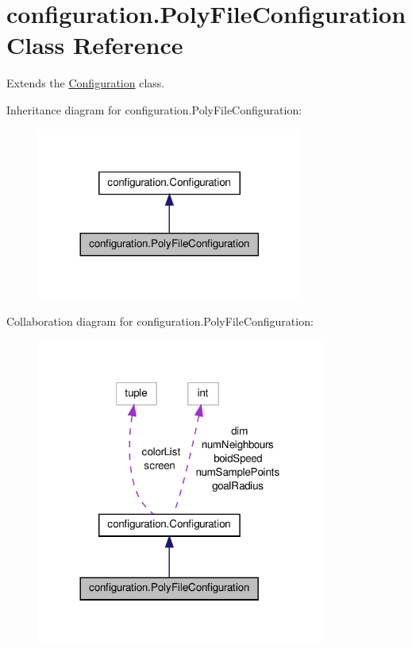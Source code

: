 \hypertarget{classconfiguration_1_1PolyFileConfiguration}{\section{configuration.\-Poly\-File\-Configuration Class Reference}
\label{classconfiguration_1_1PolyFileConfiguration}
}


Extends the \hyperlink{classconfiguration_1_1Configuration}{Configuration} class.  




Inheritance diagram for configuration.\-Poly\-File\-Configuration\-:
\nopagebreak
\begin{figure}[H]
\begin{center}
\leavevmode
\includegraphics[width=248pt]{classconfiguration_1_1PolyFileConfiguration__inherit__graph}
\end{center}
\end{figure}


Collaboration diagram for configuration.\-Poly\-File\-Configuration\-:
\nopagebreak
\begin{figure}[H]
\begin{center}
\leavevmode
\includegraphics[width=269pt]{classconfiguration_1_1PolyFileConfiguration__coll__graph}
\end{center}
\end{figure}
